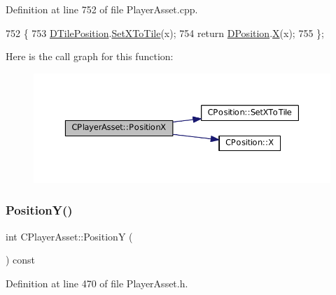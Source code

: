 Definition at line 752 of file Player\+Asset.\+cpp.


\begin{DoxyCode}
752                                 \{
753     \hyperlink{classCPlayerAsset_a5b59a9d3b7db8c7fa194b80dafb96186}{DTilePosition}.\hyperlink{classCPosition_a12795d06d34e608697b7b4c9bf202a10}{SetXToTile}(x);
754     \textcolor{keywordflow}{return} \hyperlink{classCPlayerAsset_aa9f53c009b181c7c5647c6b03776a04c}{DPosition}.\hyperlink{classCPosition_a9a6b94d3b91df1492d166d9964c865fc}{X}(x);
755 \};
\end{DoxyCode}
Here is the call graph for this function\+:\nopagebreak
\begin{figure}[H]
\begin{center}
\leavevmode
\includegraphics[width=350pt]{classCPlayerAsset_a3b0981638b2e86e1ffb211365db26b41_cgraph}
\end{center}
\end{figure}
\hypertarget{classCPlayerAsset_a4f70846298e9951489ef138847c268a5}{}\label{classCPlayerAsset_a4f70846298e9951489ef138847c268a5} 
\subsubsection{\texorpdfstring{Position\+Y()}{PositionY()}\hspace{0.1cm}{\footnotesize\ttfamily [1/2]}}
{\footnotesize\ttfamily int C\+Player\+Asset\+::\+PositionY (\begin{DoxyParamCaption}{ }\end{DoxyParamCaption}) const\hspace{0.3cm}{\ttfamily [inline]}}



Definition at line 470 of file Player\+Asset.\+h.


